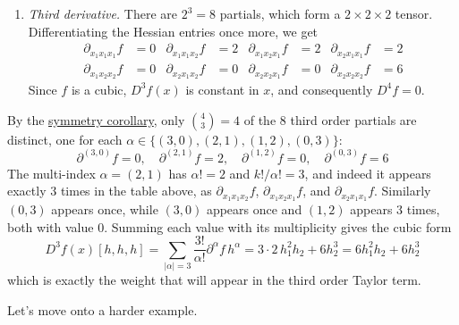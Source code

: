\begin{example}
\begin{enumerate}
      \item \textit{Third derivative.} There are $2^3 = 8$ partials, which form a $2 \times 2 \times 2$ tensor. Differentiating the Hessian entries once more, we get 
      \begin{align}
        \partial_{x_1 x_1 x_1} f & = 0 & \partial_{x_1 x_1 x_2} f & = 2 & \partial_{x_1 x_2 x_1} f & = 2 & \partial_{x_2 x_1 x_1} f & = 2 \\ 
        \partial_{x_1 x_2 x_2} f & = 0 & \partial_{x_2 x_1 x_2} f & = 0 & \partial_{x_2 x_2 x_1} f & = 0 & \partial_{x_2 x_2 x_2} f & = 6 
      \end{align}
      Since $f$ is a cubic, $D^3 f(x)$ is constant in $x$, and consequently $D^4 f = 0$. 
    \end{enumerate}
    By the \hyperref[thm:symmetry-in-kth-iterated-partials]{symmetry corollary}, only $\binom{4}{3} = 4$ of the $8$ third order partials are distinct, one for each $\alpha \in \{(3,0), (2,1), (1,2), (0,3)\}$: 
    \begin{equation}
      \partial^{(3,0)} f = 0, \quad \partial^{(2,1)} f = 2, \quad \partial^{(1,2)} f = 0, \quad \partial^{(0,3)} f = 6
    \end{equation}
    The multi-index $\alpha = (2, 1)$ has $\alpha! = 2$ and $k!/\alpha! = 3$, and indeed it appears exactly $3$ times in the table above, as $\partial_{x_1 x_1 x_2} f$, $\partial_{x_1 x_2 x_1} f$, and $\partial_{x_2 x_1 x_1} f$. Similarly $(0, 3)$ appears once, while $(3, 0)$ appears once and $(1, 2)$ appears $3$ times, both with value $0$. Summing each value with its multiplicity gives the cubic form 
    \begin{equation}
      D^3 f(x) [h, h, h] = \sum_{|\alpha| = 3} \frac{3!}{\alpha!} \partial^\alpha f \, h^\alpha = 3 \cdot 2 \, h_1^2 h_2 + 6 h_2^3 = 6 h_1^2 h_2 + 6 h_2^3
    \end{equation}
    which is exactly the weight that will appear in the third order Taylor term. 
  \end{example}

	Let's move onto a harder example. 

